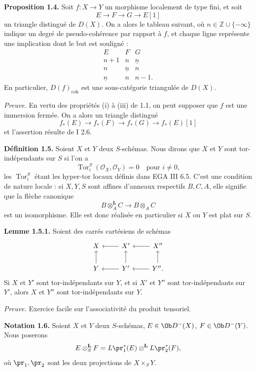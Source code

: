 \documentclass[11pt]{article}
\newcommand{\Tor}{\operatorname{Tor}}
\providecommand{\Tor}{\operatorname{Tor}}
\begin{document}
\textbf{Proposition 1.4.} Soit \(f:X\to Y\) un morphisme localement de type fini, et soit
\[
E\longrightarrow F\longrightarrow G\longrightarrow E[1]
\]
un triangle distingué de \(D(X)\). On a alors le tableau suivant, où \(n\in\mathbb Z\cup\{-\infty\}\) indique un degré de pseudo-cohérence par rapport à \(f\), et chaque ligne représente une implication dont le but est souligné :
\[
\begin{array}{ccc}
E&F&G\\
n+1&n&\underline n\\
n&\underline n&n\\
\underline n&n&n-1.
\end{array}
\]
En particulier, \(D(f)_{\mathrm{coh}}\) est une sous-catégorie triangulée de \(D(X)\).

\emph{Preuve.} En vertu des propriétés (i) à (iii) de 1.1, on peut supposer que \(f\) est une immersion fermée. On a alors un triangle distingué
\[
f_*(E)\longrightarrow f_*(F)\longrightarrow f_*(G)\longrightarrow f_*(E)[1]
\]
et l'assertion résulte de I 2.6.

\textbf{Définition 1.5.} Soient \(X\) et \(Y\) deux \(S\)-schémas. Nous dirons que \(X\) et \(Y\) sont tor-indépendants sur \(S\) si l'on a
\[
  \Tor_i^S(\mathcal O_X,\mathcal O_Y)=0\quad\text{pour }i\ne 0,
\]
les \(\Tor_i^S\) étant les hyper-tor locaux définis dans EGA III 6.5. C'est une condition de nature locale : si \(X,Y,S\) sont affines d'anneaux respectifs \(B,C,A\), elle signifie que la flèche canonique
\[
  B\otimes_A^{\mathbf L}C\longrightarrow B\otimes_A C
\]
est un isomorphisme. Elle est donc réalisée en particulier si \(X\) ou \(Y\) est plat sur \(S\).

\textbf{Lemme 1.5.1.} Soient des carrés cartésiens de schémas
\[
\begin{tikzcd}
X & X' \arrow[l] & X'' \arrow[l]\\
Y \arrow[u] & Y' \arrow[l] \arrow[u] & Y'' \arrow[l] \arrow[u].
\end{tikzcd}
\]
Si \(X\) et \(Y'\) sont tor-indépendants sur \(Y\), et si \(X'\) et \(Y''\) sont tor-indépendants sur \(Y'\), alors \(X\) et \(Y''\) sont tor-indépendants sur \(Y\).

\emph{Preuve.} Exercice facile sur l'associativité du produit tensoriel.

\textbf{Notation 1.6.} Soient \(X\) et \(Y\) deux \(S\)-schémas, \(E\in\Ob D^{-}(X)\), \(F\in\Ob D^{-}(Y)\). Nous poserons
\[
  E\otimes_S^{\mathbf L}F
  =
  L\pr_1^*(E)\otimes^{\mathbf L}L\pr_2^*(F),
\]
où \(\pr_1,\pr_2\) sont les deux projections de \(X\times_SY\).
\end{document}
